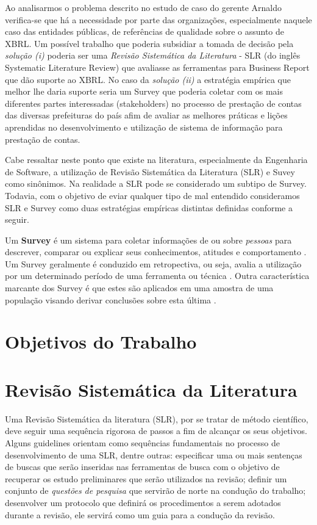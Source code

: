 \documentclass{article}
\begin{document}
Ao analisarmos o problema descrito no estudo de caso do gerente Arnaldo verifica-se que há a necessidade por parte das organizações, especialmente naquele caso das entidades públicas, de referências de qualidade sobre o assunto de XBRL. Um possível trabalho que poderia subsidiar a tomada de decisão pela \textit{solução (i)} poderia ser uma \textit{Revisão Sistemática da Literatura} - SLR (do inglês Systematic Literature Review) que avaliasse as ferramentas para Business Report que dão suporte ao XBRL. No caso da \textit{solução (ii)} a estratégia empírica que melhor lhe daria suporte seria um Survey que poderia coletar com os mais diferentes partes interessadas (stakeholders) no processo de prestação de contas das diversas prefeituras do país afim de avaliar as melhores práticas e lições aprendidas no desenvolvimento e utilização de sistema de informação para prestação de contas. 


Cabe ressaltar neste ponto que existe na literatura, especialmente da Engenharia de Software, a utilização de Revisão Sistemática da Literatura (SLR) e Suvey como sinônimos. Na realidade a SLR pode se considerado um subtipo de Survey. Todavia, com o objetivo de eviar qualquer tipo de mal entendido consideramos SLR e Survey como duas estratégias empíricas \cite{wohlin2012experimentation} distintas definidas conforme a seguir.

Um \textbf{Survey} é um sistema para coletar informações de ou sobre \textit{pessoas} para descrever, comparar ou explicar seus conhecimentos, atitudes e comportamento \cite{fink2003survey}. Um Survey geralmente é conduzido em retropectiva, ou seja, avalia a utilização por um determinado período de uma ferramenta ou técnica \cite{kitchenham2009systematic}. Outra característica marcante dos Survey é que estes são aplicados em uma amostra de uma população visando derivar conclusões sobre esta última \cite{robson2002real}.

\section{Objetivos do Trabalho}
\label{sec:objetivos}


\section{Revisão Sistemática da Literatura}
\label{sec:rsl}

Uma Revisão Sistemática da literatura (SLR), por se tratar de método científico, deve seguir uma sequência rigorosa de passos a fim de alcançar os seus objetivos. Alguns guidelines orientam como sequências fundamentais no processo de desenvolvimento de uma SLR\cite{keele2007guidelines}, dentre outras: especificar uma ou mais sentenças de buscas que serão inseridas nas ferramentas de busca com o objetivo de recuperar os estudo preliminares que serão utilizados na revisão; definir um conjunto de \textit{questões de pesquisa} que servirão de norte na condução do trabalho; desenvolver um protocolo que definirá os procedimentos a serem adotados durante a revisão, ele servirá como um guia para a condução da revisão. 
\end{document}
